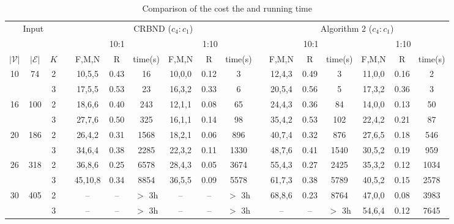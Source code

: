 \documentclass[onecolumn,11pt,draftclsnofoot]{IEEEtran}
\begin{document}
\begin{table}[!htbp]
\setlength{\tabcolsep}{3pt}
\center
\caption{Comparison of the cost the and running time}
\label{tab:comparison}
\begin{tabular}{c  c  c c c c c  c c  c c c c  c c  c c}
\toprule
\multicolumn{3}{c}{\multirow{2}{*}{Input}} & &  \multicolumn{6}{c}{CRBND ($c_4:c_1$)} & &  \multicolumn{6}{c}{Algorithm 2 ($c_4:c_1$)} \\
\cline{6-9} \cline{13-16}
\multicolumn{1}{c}{} & \multicolumn{1}{c}{}  & \multicolumn{1}{c}{}& &  \multicolumn{3}{c}{10:1} & \multicolumn{3}{c}{1:10} & & \multicolumn{3}{c}{10:1} & \multicolumn{3}{c}{1:10}\\
\cline{1-3} \cline{5-10} \cline{12-17}
$|\mathcal V|$ & $|\mathcal E|$ & $K$ & &  F,M,N & R &time(s) & F,M,N & R &time(s) & & F,M,N & R &time(s)  & F,M,N & R &time(s)\\
\hline
\multirow{2}{*}{10} &\multirow{2}{*}{74} &2  &  &10,5,5 &0.43 &16   &10,0,0 &0.12 &3  &   &12,4,3 &0.49 &3  &11,0,0 &0.16 &2\\
                                        &  &3 &  &17,5,5 &0.53 &23    &16,3,2 &0.33 &6  &  &20,5,4 &0.56 &5   &17,3,2 &0.36 &3 \\
\hline
\multirow{2}{*}{16} &\multirow{2}{*}{100} &2 &  &18,6,6 &0.40 &243   &12,1,1 &0.08 &65 &  &24,4,3 &0.36 &84   &14,0,0 &0.13 &50\\
                                          & &3  & &27,7,6 &0.50 &325   &16,1,1 &0.14 &98  &  &35,4,2 &0.53 &102   &22,4,2 &0.21 &87\\
\hline
\multirow{2}{*}{20} &\multirow{2}{*}{186} &2 &  &26,4,2 &0.31 &1568    &18,2,1 &0.06 &896 &  &40,7,4 &0.32 &876   &27,6,5 &0.18  &546\\
                                       &  &3  &  &34,6,4 &0.38 &2285   &22,3,2 &0.11 &1330  &  &48,7,6 &0.41 &1540   &30,5,2 &0.19 &959\\
\hline
\multirow{2}{*}{26} &\multirow{2}{*}{318} &2 &   &36,8,6   &0.25 &6578   &28,4,3 &0.05 &3674 &   &55,4,3 &0.27 &2425   &35,3,2 &0.12 &1034\\
                                       &  &3 &   &45,10,8  &0.34 &8854   &36,5,5 &0.09  &5578 &  &61,7,3 &0.38 &5789  &40,5,2 &0.15 &2578\\
\hline
\multirow{2}{*}{30} &\multirow{2}{*}{405} &2 &  &-- &-- &$>$ 3h     &-- &-- &$>$ 3h  &  &68,8,6 &0.23 &8764  &47,0,0 &0.08 &3983\\
                                          & &3  & &-- &-- &$>$ 3h   &-- &-- &$>$ 3h  &  &-- &-- &$>$ 3h      &54,6,4 &0.12 &7645\\
\bottomrule
\end{tabular}
\hfill
\end{table}
\end{document}
